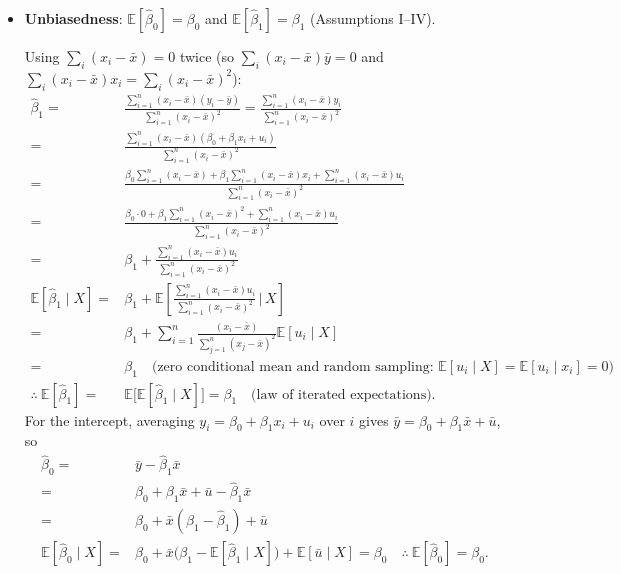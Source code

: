 \documentclass[11pt]{article}
\newcommand\E{\mathbb{E}}
\begin{document}
\begin{itemize}
  \item \textbf{Unbiasedness}: $\E[\hat{\beta}_0]=\beta_0$ and $\E[\hat{\beta}_1]= \beta_1$ (Assumptions I--IV).

Using $\sum_i (x_i - \bar x) = 0$ twice (so $\sum_i (x_i-\bar x)\bar y = 0$ and $\sum_i (x_i-\bar x)x_i = \sum_i (x_i-\bar x)^2$):
\begin{align*}
\hat{\beta}_1
=& \frac{\sum_{i=1}^n (x_i - \bar{x})(y_i - \bar{y})}{\sum_{i=1}^n(x_i - \bar{x})^2}
 = \frac{\sum_{i=1}^n (x_i - \bar{x})y_i}{\sum_{i=1}^n(x_i - \bar{x})^2}\\
 = &   \frac{\sum_{i=1}^n (x_i - \bar{x})(\beta_0+\beta_1 x_i + u_i)}{\sum_{i=1}^n(x_i - \bar{x})^2} \\
 = &  \frac{\beta_0 \sum_{i=1}^n (x_i - \bar{x})+ \beta_1 \sum_{i=1}^n (x_i - \bar{x})x_i + \sum_{i=1}^n (x_i - \bar{x})u_i}{\sum_{i=1}^n(x_i - \bar{x})^2} \\
 = & \frac{\beta_0 \cdot 0 + \beta_1 \sum_{i=1}^n (x_i - \bar{x})^2 + \sum_{i=1}^n (x_i - \bar{x})u_i}{\sum_{i=1}^n(x_i - \bar{x})^2} \\
 = &  \beta_1 + \frac{\sum_{i=1}^n (x_i - \bar{x})u_i}{\sum_{i=1}^n(x_i - \bar{x})^2}\\[6pt]
\E[\hat{\beta}_1\mid X]  = & \beta_1 + \E\left[\frac{\sum_{i=1}^n(x_i-\bar{x})u_i}{\sum_{i=1}^n(x_i - \bar{x})^2} \,\Big|\, X\right] \\
 = & \beta_1 + \sum_{i=1}^n \frac{(x_i-\bar{x})}{\sum_{j=1}^n(x_j - \bar{x})^2} \E[u_i\mid X] \\
 = & \beta_1 \quad \text{(zero conditional mean and random sampling: $\E[u_i\mid X]=\E[u_i\mid x_i]=0$)}\\[6pt]
\therefore\ \E[\hat{\beta}_1]  = & \E\big[\E[\hat{\beta}_1\mid X]\big] = \beta_1 \quad\text{(law of iterated expectations)}.
\end{align*}
For the intercept, averaging $y_i = \beta_0 + \beta_1 x_i + u_i$ over $i$ gives $\bar y = \beta_0 + \beta_1\bar x + \bar u$, so
\begin{align*}
\hat{\beta}_{0} =& \bar{y} - \hat{\beta}_{1}\bar{x} \\
 = & \beta_{0} + \beta_{1}\bar{x} + \bar{u} - \hat{\beta}_{1}\bar{x} \\
 = & \beta_{0} + \bar{x}(\beta_{1} - \hat{\beta}_{1}) + \bar u \\
\E[\hat{\beta}_0\mid X] = & \beta_{0} + \bar{x}\big(\beta_1 - \E[\hat\beta_1\mid X]\big) + \E[\bar u\mid X] = \beta_0
\quad\therefore\ \E[\hat{\beta}_0] = \beta_{0}.
\end{align*}
\clearpage


\end{itemize}
\end{document}
